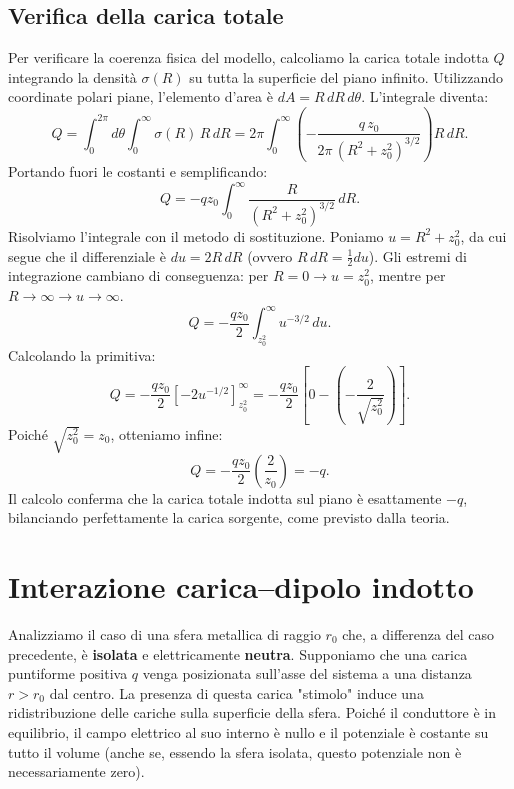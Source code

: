 \documentclass{book}
\begin{document}
\subsection*{Verifica della carica totale}
Per verificare la coerenza fisica del modello, calcoliamo la carica totale indotta \(Q\) integrando la densità \(\sigma(R)\) su tutta la superficie del piano infinito.
Utilizzando coordinate polari piane, l'elemento d'area è \(dA=R\,dR\,d\theta\). L'integrale diventa:
\[
Q=\int_{0}^{2\pi} d\theta \int_{0}^{\infty}\sigma(R)\,R\,dR
=2\pi\int_{0}^{\infty}\left(-\frac{q\,z_0}{2\pi\,(R^2+z_0^2)^{3/2}}\right)R\,dR.
\]
Portando fuori le costanti e semplificando:
\[
Q = -q z_0 \int_{0}^{\infty}\frac{R}{(R^2+z_0^2)^{3/2}}\,dR.
\]
Risolviamo l'integrale con il metodo di sostituzione. Poniamo \(u=R^2+z_0^2\), da cui segue che il differenziale è \(du=2R\,dR\) (ovvero \(R\,dR=\tfrac{1}{2}du\)).
Gli estremi di integrazione cambiano di conseguenza: per \(R=0 \to u=z_0^2\), mentre per \(R\to\infty \to u\to\infty\).
\[
Q = -\frac{q z_0}{2}\int_{z_0^2}^{\infty} u^{-3/2}\,du.
\]
Calcolando la primitiva:
\[
Q = -\frac{q z_0}{2}\left[-2u^{-1/2}\right]_{z_0^2}^{\infty}
= -\frac{q z_0}{2}\left[ 0 - \left(-\frac{2}{\sqrt{z_0^2}}\right) \right].
\]
Poiché \(\sqrt{z_0^2}=z_0\), otteniamo infine:
\[
Q = -\frac{q z_0}{2}\left( \frac{2}{z_0} \right) = -q.
\]
Il calcolo conferma che la carica totale indotta sul piano è esattamente \(-q\), bilanciando perfettamente la carica sorgente, come previsto dalla teoria.

\section{Interazione carica--dipolo indotto}

Analizziamo il caso di una sfera metallica di raggio $r_0$ che, a differenza del caso precedente, è \textbf{isolata} e elettricamente \textbf{neutra}.
Supponiamo che una carica puntiforme positiva $q$ venga posizionata sull'asse del sistema a una distanza $r > r_0$ dal centro. La presenza di questa carica "stimolo" induce una ridistribuzione delle cariche sulla superficie della sfera. Poiché il conduttore è in equilibrio, il campo elettrico al suo interno è nullo e il potenziale è costante su tutto il volume (anche se, essendo la sfera isolata, questo potenziale non è necessariamente zero).
\end{document}
